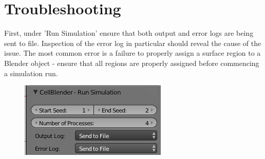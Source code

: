 \documentclass[twoside,a4paper]{refart}
\begin{document}
\section{Troubleshooting}
 First, under 'Run Simulation' ensure that both output and error logs are being sent to file. Inspection of the error log in particular should reveal the cause of the issue. The most common error is a failure to properly assign a surface region to a Blender object - ensure that all regions are properly assigned before commencing a simulation run.

    \begin{figure}[H]
        \includegraphics[scale=0.5]{trouble1.png}
    \end{figure}
\end{document}
